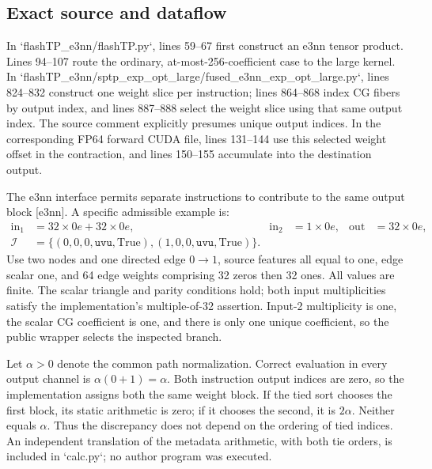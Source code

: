 \documentclass[10pt]{article}
\begin{document}
\subsection*{Exact source and dataflow}
In `flashTP\_e3nn/flashTP.py`, lines 59–67 first construct an e3nn tensor product. Lines 94–107 route the ordinary, at-most-256-coefficient case to the large kernel. In `flashTP\_e3nn/sptp\_exp\_opt\_large/fused\_e3nn\_exp\_opt\_large.py`, lines 824–832 construct one weight slice per instruction; lines 864–868 index CG fibers by output index, and lines 887–888 select the weight slice using that same output index. The source comment explicitly presumes unique output indices. In the corresponding FP64 forward CUDA file, lines 131–144 use this selected weight offset in the contraction, and lines 150–155 accumulate into the destination output.\par
The e3nn interface permits separate instructions to contribute to the same output block [e3nn]. A specific admissible example is: \[\begin{aligned}
\mathrm{in}_1&=32\times0e+32\times0e,&
\mathrm{in}_2&=1\times0e,&
\mathrm{out}&=32\times0e,\\
\mathcal I&=\{(0,0,0,\texttt{uvu},\mathrm{True}),
(1,0,0,\texttt{uvu},\mathrm{True})\}.
\end{aligned}\] Use two nodes and one directed edge \(0\to1\), source features all equal to one, edge scalar one, and 64 edge weights comprising 32 zeros then 32 ones. All values are finite. The scalar triangle and parity conditions hold; both input multiplicities satisfy the implementation’s multiple-of-32 assertion. Input-2 multiplicity is one, the scalar CG coefficient is one, and there is only one unique coefficient, so the public wrapper selects the inspected branch.\par
Let \(\alpha>0\) denote the common path normalization. Correct evaluation in every output channel is \(\alpha(0+1)=\alpha\). Both instruction output indices are zero, so the implementation assigns both the same weight block. If the tied sort chooses the first block, its static arithmetic is zero; if it chooses the second, it is \(2\alpha\). Neither equals \(\alpha\). Thus the discrepancy does not depend on the ordering of tied indices. An independent translation of the metadata arithmetic, with both tie orders, is included in `calc.py`; no author program was executed.\par
\end{document}
